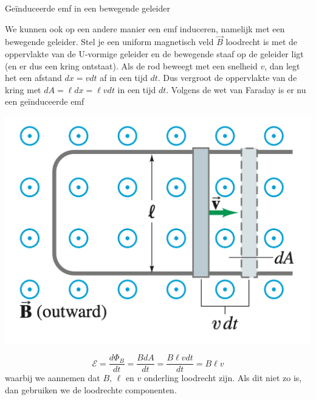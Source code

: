 \begin{app}{Geïnduceerde emf in een bewegende geleider}
    \begin{minipage}{.69\textwidth}
        We kunnen ook op een andere manier een emf induceren, namelijk met een bewegende geleider. Stel je een uniform magnetisch veld
        $\Vec{B}$ loodrecht is met de oppervlakte van de U-vormige geleider en de bewegende staaf op de geleider ligt (en er dus een kring 
        ontstaat). Als de rod beweegt met een snelheid $v$, dan legt het een afstand $dx = vdt$ af in een tijd $dt$.  Dus vergroot de oppervlakte
        van de kring met $dA = \ell dx = \ell v dt$ in een tijd $dt$. Volgens de wet van Faraday is er nu een geïnduceerde emf
    \end{minipage}
    \begin{minipage}{.27\textwidth}
        \includegraphics[scale = 0.23]{Images/Magnetisme/BewegendeGeleider}
    \end{minipage}
        \begin{equation*}
            \mathcal{E} = \dfrac{d\Phi_{B}}{dt} = \dfrac{BdA}{dt} = \dfrac{B\ell v dt}{dt} = B \ell v
        \end{equation*}
    waarbij we aannemen dat $B$, $\ell$ en $v$ onderling loodrecht zijn. Als dit niet zo is, dan gebruiken we de loodrechte componenten.
\end{app}

\newpage

